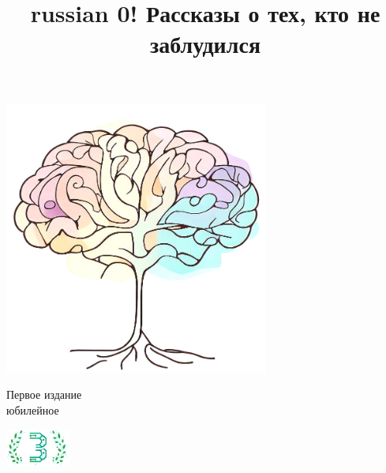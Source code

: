 \documentclass[a5paper,11pt]{memoir}
\title{\begin{otherlanguage*}{russian}
0! Рассказы о тех, кто не заблудился
\end{otherlanguage*}}
\author{}
\begin{document}

\date{} %
\maketitle
\begin{center}
\includegraphics[height=9cm]{images/tree-cover} 

\vspace{1cm}
\tiny{
Первое издание\\
юбилейное
}

\includegraphics[width=80px]{images/laurel-3.jpeg}
\end{center}


\thispagestyle{empty}
\newpage
\thispagestyle{empty}  %


\clearpage
\hfill



\addto\captionsrussian{ 
}
\end{document}
